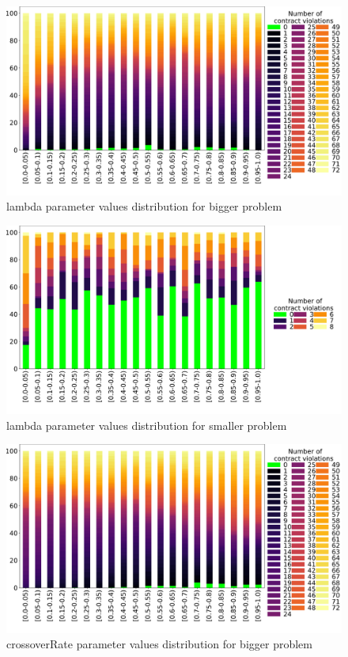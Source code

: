 \begin{figure}
	\centering
	\includegraphics[width=\textwidth]{images/DistrValidityBig/lambda.pdf}
	\caption[lambda parameter values distribution for bigger problem]{lambda parameter values distribution for bigger problem}
	\label{fig:lambda_DistBig}
\end{figure}
\begin{figure}
	\centering
	\includegraphics[width=\textwidth]{images/DistrValiditySmall/lambda.pdf}
	\caption[lambda parameter values distribution for smaller problem]{lambda parameter values distribution for smaller problem}
	\label{fig:lambda_DistSmall}
\end{figure}
\begin{figure}
	\centering
	\includegraphics[width=\textwidth]{images/DistrValidityBig/crossoverRate.pdf}
	\caption[crossoverRate parameter values distribution for bigger problem]{crossoverRate parameter values distribution for bigger problem}
	\label{fig:crossoverRate_DistBig}
\end{figure}
